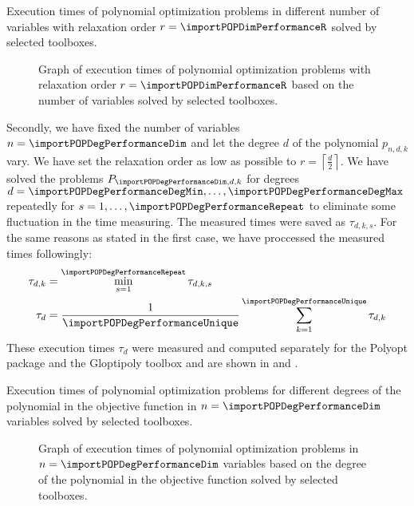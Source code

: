 \begin{table}[ht]
  \centering
  
  \caption{Execution times of polynomial optimization problems in different number of variables with relaxation order $r = \importPOPDimPerformanceR$ solved by selected toolboxes.}
\end{table}

\begin{figure}[ht]
  \centering
  \resizebox{0.95\textwidth}{!}{}
  \caption{Graph of execution times of polynomial optimization problems with relaxation order $r = \importPOPDimPerformanceR$ based on the number of variables solved by selected toolboxes.}
\end{figure}

Secondly, we have fixed the number of variables $n = \importPOPDegPerformanceDim$ and let the degree $d$ of the polynomial $p_{n,d,k}$ vary.
We have set the relaxation order as low as possible to $r = \left\lceil\frac{d}{2}\right\rceil$.
We have solved the problems $P_{\importPOPDegPerformanceDim,d,k}$ for degrees $d = \importPOPDegPerformanceDegMin, \ldots, \importPOPDegPerformanceDegMax$ repeatedly for $s = 1,\ldots, \importPOPDegPerformanceRepeat$ to eliminate some fluctuation in the time measuring.
The measured times were saved as $\tau_{d,k,s}$.
For the same reasons as stated in the first case, we have proccessed the measured times followingly:
\begin{align}
  \tau_{d,k} &= \min_{s=1}^{\importPOPDegPerformanceRepeat} \tau_{d,k,s}\\
  \tau_d &= \frac{1}{\importPOPDegPerformanceUnique}\sum_{k=1}^{\importPOPDegPerformanceUnique} \tau_{d,k}
\end{align}
These execution times $\tau_d$ were measured and computed separately for the Polyopt package and the Gloptipoly toolbox and are shown in  and .

\begin{table}[ht]
  \centering
  
  \caption{Execution times of polynomial optimization problems for different degrees of the polynomial in the objective function in $n = \importPOPDegPerformanceDim$ variables solved by selected toolboxes.}
\end{table}

\begin{figure}[ht]
  \centering
  \resizebox{0.95\textwidth}{!}{}
  \caption{Graph of execution times of polynomial optimization problems in $n = \importPOPDegPerformanceDim$ variables based on the degree of the polynomial in the objective function solved by selected toolboxes.}
\end{figure}

